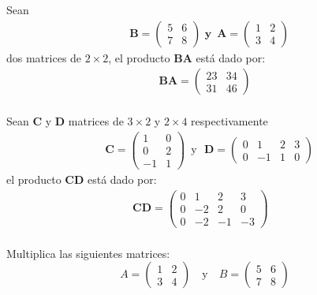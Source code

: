 \begin{example}
Sean 
$$\begin{aligned}
  & \boldsymbol{B}=\left(\begin{array}{ll}
5 & 6 \\
7 & 8
\end{array}\right)\,\,\textbf{y}\,\,\,\boldsymbol{A}=\left(\begin{array}{ll}
1 & 2 \\
3 & 4
\end{array}\right)
\end{aligned}$$ dos matrices de $2\times2$,
el producto $\boldsymbol{BA}$ está dado por:
$$\begin{aligned}
\boldsymbol{BA}=\left(\begin{array}{ll}
23 & 34 \\
31 & 46
\end{array}\right) \\
\end{aligned}$$
\end{example}
\begin{example}
Sean $\boldsymbol{C}$ y $\boldsymbol{D}$ matrices de $3\times2$ y $2\times4$ respectivamente
$$ 
\begin{aligned}
& \boldsymbol{C}=\left(\begin{array}{cc}
1 & 0 \\
0 & 2 \\
-1 & 1
\end{array}\right) \,\,\,\text{y}\,\,\,\,\boldsymbol{D}=\left(\begin{array}{cccc}
0 & 1 & 2 & 3 \\
0 & -1 & 1 & 0
\end{array}\right)
\end{aligned}$$
el producto $\boldsymbol{CD}$ está dado por:
$$\begin{aligned}
\boldsymbol{CD}=\left(\begin{array}{cccc}
0 & 1 & 2 & 3 \\
0 & -2 & 2 & 0 \\
0 & -2 & -1 & -3
\end{array}\right) \\
&      
\end{aligned}$$
\end{example}
\begin{exercise}
Multiplica las siguientes matrices:
\[ A = \begin{pmatrix} 1 & 2 \\ 3 & 4 \end{pmatrix} \quad \text{y} \quad B = \begin{pmatrix} 5 & 6 \\ 7 & 8 \end{pmatrix} \]
\end{exercise}
